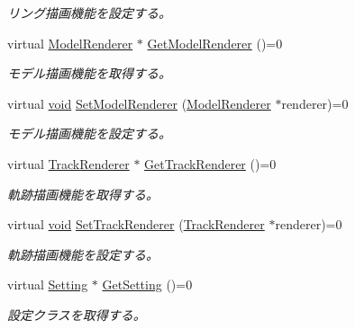 \begin{DoxyCompactItemize}
\begin{DoxyCompactList}\small\item\em リング描画機能を設定する。 \end{DoxyCompactList}\item 
virtual \mbox{\hyperlink{class_effekseer_1_1_model_renderer}{Model\+Renderer}} $\ast$ \mbox{\hyperlink{class_effekseer_1_1_manager_a6ed37b18b9e99ff77f9608da3f4db93a}{Get\+Model\+Renderer}} ()=0
\begin{DoxyCompactList}\small\item\em モデル描画機能を取得する。 \end{DoxyCompactList}\item 
virtual \mbox{\hyperlink{namespace_effekseer_ab34c4088e512200cf4c2716f168deb56}{void}} \mbox{\hyperlink{class_effekseer_1_1_manager_aa423ee424d0b713ac4939fc7faf39b9c}{Set\+Model\+Renderer}} (\mbox{\hyperlink{class_effekseer_1_1_model_renderer}{Model\+Renderer}} $\ast$renderer)=0
\begin{DoxyCompactList}\small\item\em モデル描画機能を設定する。 \end{DoxyCompactList}\item 
virtual \mbox{\hyperlink{class_effekseer_1_1_track_renderer}{Track\+Renderer}} $\ast$ \mbox{\hyperlink{class_effekseer_1_1_manager_a0ad29aecf744eeba8896cb6fa77488cf}{Get\+Track\+Renderer}} ()=0
\begin{DoxyCompactList}\small\item\em 軌跡描画機能を取得する。 \end{DoxyCompactList}\item 
virtual \mbox{\hyperlink{namespace_effekseer_ab34c4088e512200cf4c2716f168deb56}{void}} \mbox{\hyperlink{class_effekseer_1_1_manager_a7bff3a7ec23d6ae4a66b6f6ba4bd58fc}{Set\+Track\+Renderer}} (\mbox{\hyperlink{class_effekseer_1_1_track_renderer}{Track\+Renderer}} $\ast$renderer)=0
\begin{DoxyCompactList}\small\item\em 軌跡描画機能を設定する。 \end{DoxyCompactList}\item 
virtual \mbox{\hyperlink{class_effekseer_1_1_setting}{Setting}} $\ast$ \mbox{\hyperlink{class_effekseer_1_1_manager_ac32fce48f01429c6274b6237b61ec47d}{Get\+Setting}} ()=0
\begin{DoxyCompactList}\small\item\em 設定クラスを取得する。 \end{DoxyCompactList}\item 

\end{DoxyCompactItemize}
